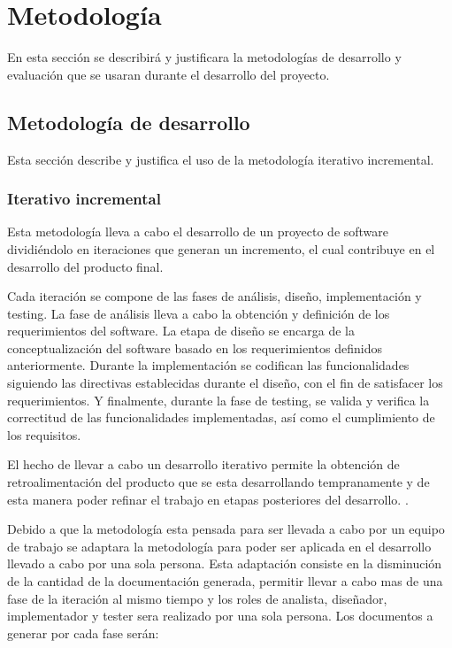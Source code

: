 \documentclass[11pt,letterpaper]{article}
\begin{document}
\section{Metodología}

En esta sección se describirá y justificara la metodologías de desarrollo y evaluación que se usaran durante el desarrollo del proyecto.
\subsection{Metodología de desarrollo}


Esta sección describe y justifica el uso de la metodología iterativo incremental.
\subsubsection{Iterativo incremental}

Esta metodología lleva a cabo el desarrollo de un proyecto de software dividiéndolo en iteraciones que generan un incremento, el cual contribuye en el desarrollo del producto final. 

Cada iteración se compone de las fases de análisis, diseño, implementación y testing. La fase de análisis lleva a cabo la obtención y definición de los requerimientos del software. La etapa de diseño se encarga de la conceptualización del software basado en los requerimientos definidos anteriormente. Durante la implementación se codifican las funcionalidades siguiendo las directivas establecidas durante el diseño, con el fin de satisfacer los requerimientos. Y finalmente, durante la fase de testing, se valida y verifica la correctitud de las funcionalidades implementadas, así como el cumplimiento de los requisitos. 

El hecho de llevar a cabo un desarrollo iterativo permite la obtención de retroalimentación del producto que se esta desarrollando tempranamente y de esta manera poder refinar el trabajo en etapas posteriores del desarrollo. \cite{Victor2003, Mitchell2009, Martin1999,Alshamrani2015}.

Debido a que la metodología esta pensada para ser llevada a cabo por un equipo de trabajo se adaptara la metodología para poder ser aplicada en el desarrollo llevado a cabo por una sola persona. Esta adaptación consiste en la disminución de la cantidad de la documentación generada, permitir llevar a cabo mas de una fase de la iteración al mismo tiempo y los roles de analista, diseñador, implementador y tester sera realizado por una sola persona. Los documentos a generar por cada fase serán:
\end{document}
